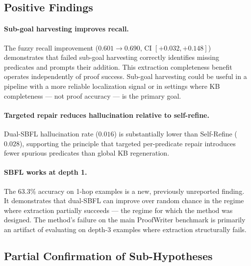 \documentclass[11pt,letterpaper]{article}
\begin{document}
\subsection{Positive Findings}

\paragraph{Sub-goal harvesting improves recall.} The fuzzy recall improvement ($0.601 \to 0.690$, CI $[+0.032, +0.148]$) demonstrates that failed sub-goal harvesting correctly identifies missing predicates and prompts their addition. This extraction completeness benefit operates independently of proof success. Sub-goal harvesting could be useful in a pipeline with a more reliable localization signal or in settings where KB completeness — not proof accuracy — is the primary goal.

\paragraph{Targeted repair reduces hallucination relative to self-refine.} Dual-SBFL hallucination rate ($0.016$) is substantially lower than Self-Refine ($0.028$), supporting the principle that targeted per-predicate repair introduces fewer spurious predicates than global KB regeneration.

\paragraph{SBFL works at depth 1.} The $63.3\%$ accuracy on 1-hop examples is a new, previously unreported finding. It demonstrates that dual-SBFL can improve over random chance in the regime where extraction partially succeeds — the regime for which the method was designed. The method's failure on the main ProofWriter benchmark is primarily an artifact of evaluating on depth-3 examples where extraction structurally fails.

\subsection{Partial Confirmation of Sub-Hypotheses}
\end{document}
